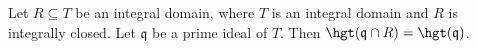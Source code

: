 Let $R \subseteq T$ be an integral domain, where $T$ is an integral domain
and $R$ is integrally closed.  Let $\mathfrak{q}$ be a prime ideal of $T$.
Then $\hgt(\mathfrak{q}\cap R) = \hgt(\mathfrak{q})$.

